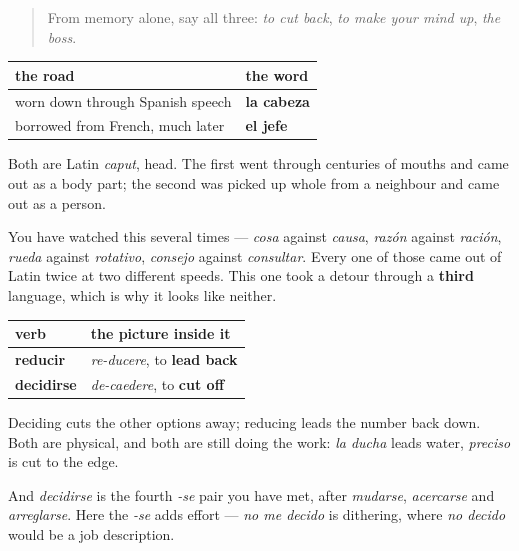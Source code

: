 \label{lesson:ES-R462-repaso-jefe}



\begin{quote}
From memory alone, say all three: \emph{to cut back}, \emph{to make your mind up}, \emph{the boss}.
\end{quote}

\begin{grammarlens}[title={Grammar Lens: one word, two roads, four hundred years apart}]
\noindent
\begin{tabularx}{\linewidth}{@{}>{\raggedright\arraybackslash}X>{\raggedright\arraybackslash}X@{}}
\toprule
\textbf{the road} & \textbf{the word} \\
\midrule
worn down through Spanish speech & \textbf{la cabeza} \\
borrowed from French, much later & \textbf{el jefe} \\
\bottomrule
\end{tabularx}

Both are Latin \emph{caput}, head. The first went through centuries of mouths and came out as a body part; the second was picked up whole from a neighbour and came out as a person.

You have watched this several times — \emph{cosa} against \emph{causa}, \emph{razón} against \emph{ración}, \emph{rueda} against \emph{rotativo}, \emph{consejo} against \emph{consultar}. Every one of those came out of Latin twice at two different speeds. This one took a detour through a \textbf{third} language, which is why it looks like neither.
\end{grammarlens}

\begin{grammarlens}[title={Grammar Lens: two verbs, two pictures of cutting and leading}]
\noindent
\begin{tabularx}{\linewidth}{@{}>{\raggedright\arraybackslash}X>{\raggedright\arraybackslash}X@{}}
\toprule
\textbf{verb} & \textbf{the picture inside it} \\
\midrule
\textbf{reducir} & \emph{re-ducere}, to \textbf{lead back} \\
\textbf{decidirse} & \emph{de-caedere}, to \textbf{cut off} \\
\bottomrule
\end{tabularx}

Deciding cuts the other options away; reducing leads the number back down. Both are physical, and both are still doing the work: \emph{la ducha} leads water, \emph{preciso} is cut to the edge.

And \emph{decidirse} is the fourth \emph{-se} pair you have met, after \emph{mudarse}, \emph{acercarse} and \emph{arreglarse}. Here the \emph{-se} adds effort — \emph{no me decido} is dithering, where \emph{no decido} would be a job description.
\end{grammarlens}

